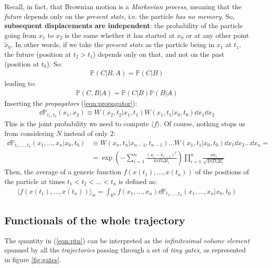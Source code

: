 \documentclass[../template.tex]{subfiles}
\begin{document}
Recall, in fact, that Brownian motion is a \textit{Markovian process}, meaning that the \textit{future} depends only on the \textit{present state}, i.e. the particle \textit{has no memory}. So, \textbf{subsequent displacements are independent}: the probability of the particle going from $x_1$ to $x_2$ is the same whether it has started at $x_0$ or at any other point $\tilde{x}_0$. In other words, if we take the \textit{present state} as the particle being in $x_1$ at $t_1$, the future (position at $t_2 > t_1$) depends only on that, and not on the past (position at $t_0$). So:
\begin{align*}
    \mathbb{P}(C|B,A) = \mathbb{P}(C|B)
\end{align*}             
leading to:
\begin{align*}
    \mathbb{P}(C,B|A) = \mathbb{P}(C|B) \mathbb{P}(B|A)
\end{align*}
Inserting the \textit{propagators} (\ref{eqn:propagator}):
\begin{align*}
    \dd{\mathbb{P}}_{t_1,t_2}(x_1, x_2) \equiv W(x_2,t_2|x_1,t_1) W(x_1,t_1|x_0,t_0) \dd{x_1} \dd{x_2}
\end{align*}  
This is the joint probability we need to compute $\langle f \rangle$. Of course, nothing stops us from considering $N$  instead of only $2$:
\begin{align} \nonumber
    \dd{\mathbb{P}}_{t_1,\dots,t_n}(x_1,\dots,x_n |x_0,t_0) &\equiv W(x_n, t_n |x_{n-1},t_{n-1}) \dots W(x_1,t_1|x_0,t_0) \dd{x_1} \dd{x_2} \dots \dd{x_n} =\\
    &= \exp\left(-\sum_{i=1}^n \frac{(x_i - x_{i-1})^2}{4 \pi D \Delta t_i} \right) \prod_{i=1}^n \frac{\dd{x_i}}{\sqrt{4 \pi D \Delta t_i}} 
    \label{eqn:ptn}
\end{align}  
Then, the average of a generic function $f(x(t_1), \dots, x(t_n))$ of the positions of the particle at times $t_1 < t_2 < \dots < t_n$ is defined as:
\begin{align*}
    \langle f(x(t_1), \dots, x(t_n)) \rangle_w = \int_{\mathbb{R}^n} f(x_1, \dots, x_n) \dd{\mathbb{P}}_{t_1, \dots, t_n} (x_1, \dots, x_n|x_0,t_0)
\end{align*}  

\subsection{Functionals of the whole trajectory}
The quantity in (\ref{eqn:ptn}) can be interpreted as the \textit{infinitesimal volume element} spanned by all the \textit{trajectories} passing through a set of \textit{tiny gates}, as represented in figure \ref{fig:gates}.
\end{document}
